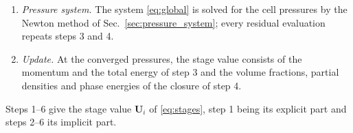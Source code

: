 \begin{enumerate}
physical budget \eqref{eq:Qk} computed on $X^*$ after step 1 and frozen during the stage, and the relaxation closure of
Sec.~\ref{sec:relaxation} returns $\bar p^{\rm cl}_{i,j}$ and the phase states.
\item \emph{Pressure system.} The system \eqref{eq:global} is solved for the cell pressures by the Newton method of
Sec.~\ref{sec:pressure_system}; every residual evaluation repeats steps 3 and 4.
\item \emph{Update.} At the converged pressures, the stage value consists of the momentum and the total energy of
step 3 and the volume fractions, partial densities and phase energies of the closure of step 4.
\end{enumerate}
Steps 1--6 give the stage value $\mathbf U_i$ of \eqref{eq:stages}, step 1 being its explicit part and steps 2--6 its implicit part.
